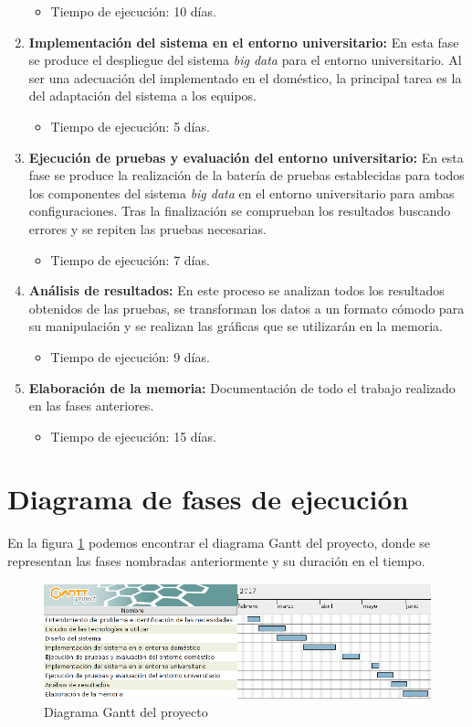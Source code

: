 \begin{enumerate}
\begin{itemize}
\item Tiempo de ejecución: 10 días.
\end{itemize}

\item \textbf{Implementación del sistema en el entorno universitario:}
En esta fase se produce el despliegue del sistema \textit{big data} para el entorno universitario. Al ser una adecuación del implementado en el doméstico, la principal tarea es la  del adaptación del sistema a los equipos.

\begin{itemize}
\item Tiempo de ejecución: 5 días.
\end{itemize}

\item \textbf{Ejecución de pruebas y evaluación del entorno universitario:}
En esta fase se produce la realización de la batería de pruebas establecidas para todos los componentes del sistema \textit{big data} en el entorno universitario para ambas configuraciones. Tras la finalización se comprueban los resultados buscando errores y se repiten las pruebas necesarias.

\begin{itemize}
\item Tiempo de ejecución: 7 días.
\end{itemize}

\item \textbf{Análisis de resultados:}
En este proceso se analizan todos los resultados obtenidos de las pruebas, se transforman los datos a un formato cómodo para su manipulación y se realizan las gráficas que se utilizarán en la memoria.

\begin{itemize}
\item Tiempo de ejecución: 9 días.
\end{itemize}

\item \textbf{Elaboración de la memoria:}
Documentación de todo el trabajo realizado en las fases anteriores.

\begin{itemize}
\item Tiempo de ejecución: 15 días.
\end{itemize}
\end{enumerate}

\section{Diagrama de fases de ejecución}
En la figura \ref{fig:ganttdelproyecto} podemos encontrar el diagrama Gantt del proyecto, donde se representan las fases nombradas anteriormente y su duración en el tiempo.

\begin{figure}[htp!]
\centering
\caption{Diagrama Gantt del proyecto}
\label{fig:ganttdelproyecto}
\includegraphics[scale=0.55]{graphics/gantDelProyecto}
\end{figure}